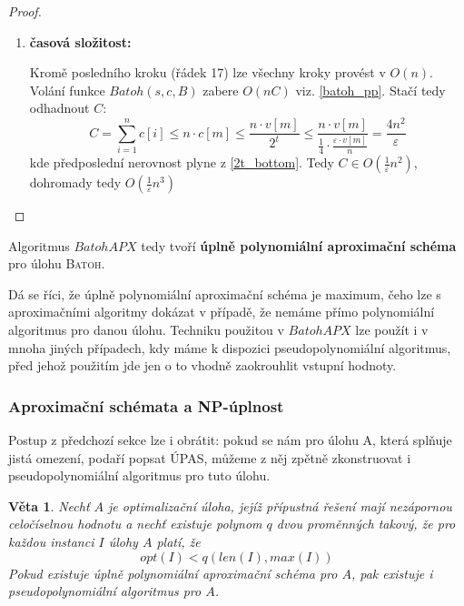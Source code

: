 \documentclass[11pt]{report} %
\newtheorem{theorem}{Věta}[section]
\numberwithin{equation}{section}
\begin{document}
\begin{proof}
\begin{enumerate}
\begin{enumerate}
	
	
\end{enumerate}

\item \textbf{časová složitost:}

Kromě posledního kroku (řádek 17) lze všechny kroky provést v $O(n)$. Volání funkce $Batoh(s,c,B)$ zabere $O(nC)$ viz. \ref{batoh_pp}. Stačí tedy odhadnout $C$:
\begin{equation*}
	C = \sum\limits_{i=1}^{n} c[i] \leq n \cdot c[m] \leq \frac{n \cdot v[m]}{2^t} \leq \frac{n \cdot v[m]}{\frac{1}{4}\cdot \frac{\varepsilon \cdot v[m]}{n}} = \frac{4n^2}{\varepsilon}
\end{equation*}
kde předposlední nerovnost plyne z \ref{2t_bottom}. Tedy $C \in O(\frac{1}{\varepsilon}n^2)$, dohromady tedy $O(\frac{1}{\varepsilon}n^3)$
\end{enumerate}

\end{proof}

Algoritmus $BatohAPX$ tedy tvoří \textbf{úplně polynomiální aproximační schéma} pro úlohu \textsc{Batoh}. 

Dá se říci, že úplně polynomiální aproximační schéma je maximum, čeho lze s aproximačními algoritmy dokázat v případě, že nemáme přímo polynomiální algoritmus pro danou úlohu. Techniku použitou v $BatohAPX$ lze použít i v mnoha jiných
případech, kdy máme k dispozici pseudopolynomiální algoritmus, před jehož použitím jde jen o to vhodně zaokrouhlit vstupní hodnoty.

\subsubsection{Aproximační schémata a NP-úplnost}
Postup z předchozí sekce lze i obrátit: pokud se nám pro úlohu A, která splňuje jistá omezení, podaří popsat ÚPAS, můžeme z něj zpětně zkonstruovat i pseudopolynomiální algoritmus pro tuto úlohu.

\begin{theorem}
\label{apx_np}
Nechť $A$ je optimalizační úloha, jejíž přípustná řešení mají nezápornou celočíselnou hodnotu a nechť existuje polynom $q$ dvou proměnných takový, že pro každou instanci $I$ úlohy $A$ platí, že
$$opt(I) < q(len(I), max(I))$$
Pokud existuje úplně polynomiální aproximační schéma pro $A$, pak existuje i pseudopolynomiální algoritmus pro $A$.
\end{theorem}
\end{document}
